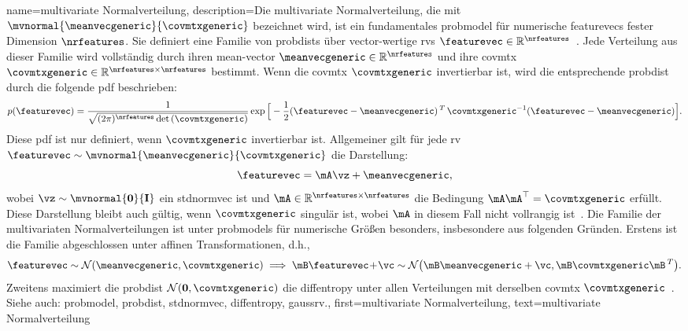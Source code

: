 {{{{
{
    name={multivariate Normalverteilung}, 
    description={Die multivariate Normalverteilung, 
        die mit $\mvnormal{\meanvecgeneric}{\covmtxgeneric}$ bezeichnet wird, ist ein fundamentales 
        \gls{probmodel} für numerische \glspl{featurevec} fester Dimension $\nrfeatures$. 
        Sie definiert eine Familie von \glspl{probdist} über \gls{vector}-wertige \glspl{rv} 
        $\featurevec \in \mathbb{R}^{\nrfeatures}$~\cite{BertsekasProb,GrayProbBook,Lapidoth09}. 
        Jede Verteilung aus dieser Familie wird vollständig durch ihren \gls{mean}-\gls{vector} 
        $\meanvecgeneric \in \mathbb{R}^{\nrfeatures}$ und ihre \gls{covmtx} 
        $\covmtxgeneric \in \mathbb{R}^{\nrfeatures \times \nrfeatures}$ bestimmt. 
        Wenn die \gls{covmtx} $\covmtxgeneric$ invertierbar ist, wird die entsprechende 
        \gls{probdist} durch die folgende \gls{pdf} beschrieben:
        \[
        p(\featurevec) = 
        \frac{1}{\sqrt{(2\pi)^{\nrfeatures} \det\,(\covmtxgeneric)}} 
        \exp\Big[ -\frac{1}{2} 
        (\featurevec - \meanvecgeneric)\,^{T}\, \covmtxgeneric^{-1} 
        (\featurevec - \meanvecgeneric) \Big].
        \]
        Diese \gls{pdf} ist nur definiert, wenn $\covmtxgeneric$ invertierbar ist.
        Allgemeiner gilt für jede \gls{rv} $\featurevec \sim \mvnormal{\meanvecgeneric}{\covmtxgeneric}$ die Darstellung:
        \[
        \featurevec = \mA \vz + \meanvecgeneric,
        \]
        wobei $\vz \sim \mvnormal{\mathbf{0}}{\mathbf{I}}$ ein \gls{stdnormvec} ist und 
        $\mA \in \mathbb{R}^{\nrfeatures \times \nrfeatures}$ die Bedingung $\mA \mA^\top = \covmtxgeneric$ erfüllt. 
        Diese Darstellung bleibt auch gültig, wenn $\covmtxgeneric$ singulär ist, wobei $\mA$ in diesem Fall 
        nicht vollrangig ist~\cite[Ch. 23]{Lapidoth2017}.
        Die Familie der multivariaten Normalverteilungen ist unter \glspl{probmodel} für numerische 
        Größen besonders, insbesondere aus folgenden Gründen. Erstens ist die Familie abgeschlossen unter affinen 
        Transformationen, d.h.,
        \[
        \featurevec \sim \mathcal{N}(\meanvecgeneric,\covmtxgeneric) \implies 
        \mB\featurevec\!+\!\vc \sim \mathcal{N}\big( \mB\meanvecgeneric+\vc,\mB \covmtxgeneric \mB\,^{T} \big). 
        \]
        Zweitens maximiert die \gls{probdist} $\mathcal{N}(\mathbf{0},\covmtxgeneric)$ die 
        \gls{diffentropy} unter allen Verteilungen mit derselben \gls{covmtx} $\covmtxgeneric$~\cite{coverthomas}. 
        \\ 
        Siehe auch: \gls{probmodel}, \gls{probdist}, \gls{stdnormvec}, \gls{diffentropy}, \gls{gaussrv}.}, 
    first={multivariate Normalverteilung},
    text={multivariate Normalverteilung}
}



}}}}
